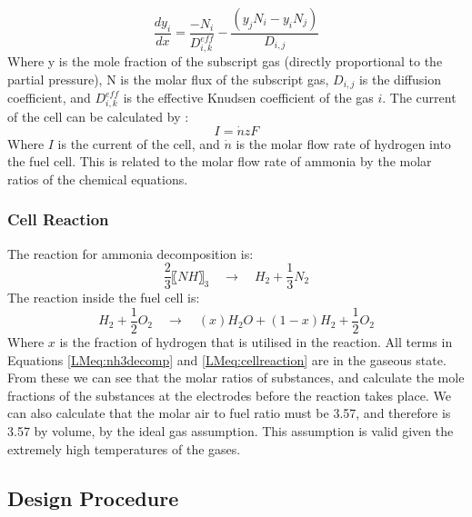 \begin{equation}
\frac{dy_{i}}{dx}=  \frac{-N_i}{D_{i,k}^{eff}}  - \frac{(y_j N_i- y_i N_j)}{D_{i,j}}
\end{equation}
Where y is the mole fraction of the subscript gas (directly proportional to the partial pressure), N is the molar flux of the subscript gas, $D_{i,j}$ is the diffusion coefficient, and $D_{i,k}^{eff}$ is the effective Knudsen coefficient of the gas $i$. 
The current of the cell can be calculated by \cite{LM2}:
\begin{equation}
I= \dot n zF					
\end{equation}
Where $I$ is the current of the cell, and $\dot n$ is the molar flow rate of hydrogen into the fuel cell. This is related to the molar flow rate of ammonia by the molar ratios of the chemical equations.


    \subsubsection{Cell Reaction}
    \label{LMcellreaction}
    The reaction for ammonia decomposition is:
    \begin{equation}
\frac{2}{3} 〖NH〗_3   \quad \rightarrow \quad   H_2 +  \frac{1}{3} N_2	
\label{LMeq:nh3decomp}
\end{equation}
\newline
The reaction inside the fuel cell is:
\begin{equation}
H_2+  \frac{1}{2} O_2   \quad \rightarrow \quad  (x)H_2 O + (1-x)H_2 +  \frac{1}{2} O_2
\label{LMeq:cellreaction}
\end{equation}
Where $x$ is the fraction of hydrogen that is utilised in the reaction. All terms in Equations \ref{LMeq:nh3decomp} and \ref{LMeq:cellreaction} are in the gaseous state. From these we can see that the molar ratios of substances, and calculate the mole fractions of the substances at the electrodes before the reaction takes place. We can also calculate that the molar air to fuel ratio must be 3.57, and therefore is 3.57 by volume, by the ideal gas assumption. This assumption is valid given the extremely high temperatures of the gases.


\subsection{Design Procedure}

